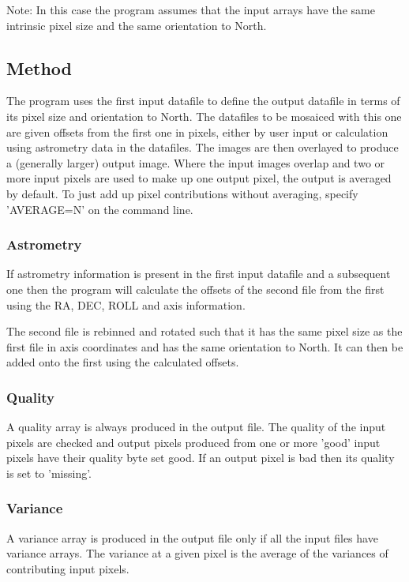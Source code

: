 \documentclass{book}
\renewcommand{\_}{{\tt\char'137}}     %
\begin{document}
Note: In this case the program assumes that the input arrays have the
same intrinsic pixel size and the same orientation to North.
 
\subsection{Method}
The program uses the first input datafile to define the output
datafile in terms of its pixel size and orientation to North.
The datafiles to be mosaiced with this one are given offsets from
the first one in pixels, either by user input or calculation using
astrometry data in the datafiles. The images are then overlayed to
produce a (generally larger) output image. Where the input images
overlap and two or more input pixels are used to make up one output
pixel, the output is averaged by default. To just add up pixel
contributions without averaging, specify 'AVERAGE=N' on the command
line.
 
\subsubsection{Astrometry}
If astrometry information is present in the first input datafile and
a subsequent one then the program will calculate the offsets of the
second file from the first using the RA, DEC, ROLL and axis
information.
 
The second file is rebinned and rotated such that it has the same pixel
size as the first file in axis coordinates and has the same orientation
to North. It can then be added onto the first using the calculated
offsets.
 
\subsubsection{Quality}
A quality array is always produced in the output file. The quality of
the input pixels are checked and output pixels produced from one or
more 'good' input pixels have their quality byte set good. If an output
pixel is bad then its quality is set to 'missing'.
 
\subsubsection{Variance}
A variance array is produced in the output file only if all the input
files have variance arrays. The variance at a given pixel is the average
of the variances of contributing input pixels.
 
\end{document}
